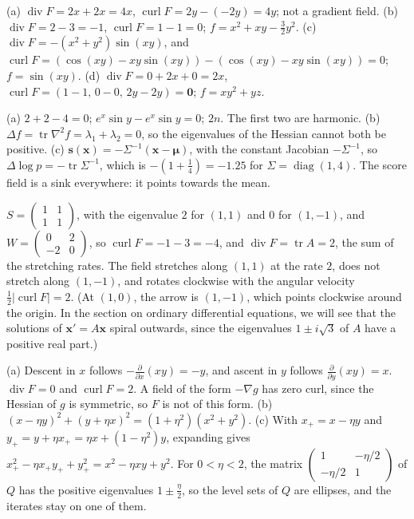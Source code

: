 \documentclass[11pt]{article}
\DeclareMathOperator{\tr}{tr}
\DeclareMathOperator{\diag}{diag}
\DeclareMathOperator{\Div}{div}
\DeclareMathOperator{\curl}{curl}
\begin{document}
\begin{description}[leftmargin=0pt, itemsep=0.3em]
    \item[\ref{pr:div-curl}.] (a) $\Div F = 2x + 2x = 4x$, $\curl F = 2y - (-2y) = 4y$; not a gradient field. (b) $\Div F = 2 - 3 = -1$, $\curl F = 1 - 1 = 0$; $f = x^2 + xy - \frac{3}{2}y^2$. (c) $\Div F = -(x^2 + y^2)\sin(xy)$, and $\curl F = (\cos(xy) - xy\sin(xy)) - (\cos(xy) - xy\sin(xy)) = 0$; $f = \sin(xy)$. (d) $\Div F = 0 + 2x + 0 = 2x$, $\curl F = (1 - 1, \, 0 - 0, \, 2y - 2y) = \mathbf{0}$; $f = xy^2 + yz$.
    \item[\ref{pr:laplacian}.] (a) $2 + 2 - 4 = 0$; $e^x\sin y - e^x\sin y = 0$; $2n$. The first two are harmonic. (b) $\Delta f = \tr\nabla^2 f = \lambda_1 + \lambda_2 = 0$, so the eigenvalues of the Hessian cannot both be positive. (c) $\mathbf{s}(\mathbf{x}) = -\Sigma^{-1}(\mathbf{x} - \boldsymbol{\mu})$, with the constant Jacobian $-\Sigma^{-1}$, so $\Delta\log p = -\tr\Sigma^{-1}$, which is $-(1 + \frac{1}{4}) = -1.25$ for $\Sigma = \diag(1, 4)$. The score field is a sink everywhere: it points towards the mean.
    \item[\ref{pr:stretch-rotate}.] $S = \left(\begin{smallmatrix} 1 & 1 \\ 1 & 1 \end{smallmatrix}\right)$, with the eigenvalue $2$ for $(1, 1)$ and $0$ for $(1, -1)$, and $W = \left(\begin{smallmatrix} 0 & 2 \\ -2 & 0 \end{smallmatrix}\right)$, so $\curl F = -1 - 3 = -4$, and $\Div F = \tr A = 2$, the sum of the stretching rates. The field stretches along $(1, 1)$ at the rate $2$, does not stretch along $(1, -1)$, and rotates clockwise with the angular velocity $\frac{1}{2}|\curl F| = 2$. (At $(1, 0)$, the arrow is $(1, -1)$, which points clockwise around the origin. In the section on ordinary differential equations, we will see that the solutions of $\mathbf{x}' = A\mathbf{x}$ spiral outwards, since the eigenvalues $1 \pm i\sqrt{3}$ of $A$ have a positive real part.)
    \item[\ref{pr:gda}.] (a) Descent in $x$ follows $-\frac{\partial}{\partial x}(xy) = -y$, and ascent in $y$ follows $\frac{\partial}{\partial y}(xy) = x$. $\Div F = 0$ and $\curl F = 2$. A field of the form $-\nabla g$ has zero curl, since the Hessian of $g$ is symmetric, so $F$ is not of this form. (b) $(x - \eta y)^2 + (y + \eta x)^2 = (1 + \eta^2)(x^2 + y^2)$. (c) With $x_+ = x - \eta y$ and $y_+ = y + \eta x_+ = \eta x + (1 - \eta^2)y$, expanding gives $x_+^2 - \eta x_+y_+ + y_+^2 = x^2 - \eta xy + y^2$. For $0 < \eta < 2$, the matrix $\left(\begin{smallmatrix} 1 & -\eta/2 \\ -\eta/2 & 1 \end{smallmatrix}\right)$ of $Q$ has the positive eigenvalues $1 \pm \frac{\eta}{2}$, so the level sets of $Q$ are ellipses, and the iterates stay on one of them.

\end{description}
\end{document}

